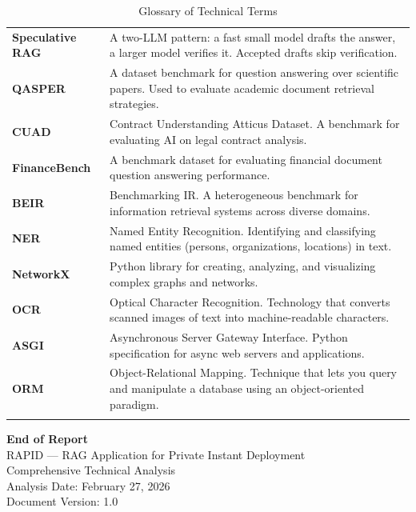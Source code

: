 \documentclass[12pt, a4paper, oneside]{report}
\begin{document}
\begin{longtable}{>{\bfseries}p{3.2cm}p{11.3cm}}
Speculative RAG & A two-LLM pattern: a fast small model drafts the answer, a larger model verifies it. Accepted drafts skip verification. \\
QASPER & A dataset benchmark for question answering over scientific papers. Used to evaluate academic document retrieval strategies. \\
CUAD & Contract Understanding Atticus Dataset. A benchmark for evaluating AI on legal contract analysis. \\
FinanceBench & A benchmark dataset for evaluating financial document question answering performance. \\
BEIR & Benchmarking IR. A heterogeneous benchmark for information retrieval systems across diverse domains. \\
NER & Named Entity Recognition. Identifying and classifying named entities (persons, organizations, locations) in text. \\
NetworkX & Python library for creating, analyzing, and visualizing complex graphs and networks. \\
OCR & Optical Character Recognition. Technology that converts scanned images of text into machine-readable characters. \\
ASGI & Asynchronous Server Gateway Interface. Python specification for async web servers and applications. \\
ORM & Object-Relational Mapping. Technique that lets you query and manipulate a database using an object-oriented paradigm. \\
\bottomrule
\caption{Glossary of Technical Terms}
\end{longtable}

\cleardoublepage
\begin{center}
  \vspace*{8cm}
  {\Large\sffamily\bfseries\color{rapidblue} End of Report}\\[1cm]
  {\normalsize\sffamily\color{rapidgray}
    RAPID — RAG Application for Private Instant Deployment\\
    Comprehensive Technical Analysis\\[0.5cm]
    Analysis Date: February 27, 2026\\
    Document Version: 1.0
  }
\end{center}
\end{document}
